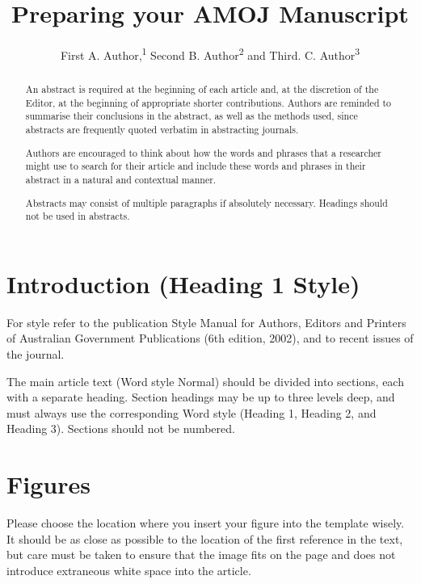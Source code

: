 \documentclass[10pt]{article}
\title{Preparing your AMOJ Manuscript}
\author{First A. Author,\textsuperscript{1} Second B. Author\textsuperscript{2} and Third. C. Author\textsuperscript{3}}
\begin{document}
\maketitle


\begin{abstract}
An abstract is required at the beginning of each article and, at the discretion of the Editor, at the beginning of appropriate shorter contributions. Authors are reminded to summarise their conclusions in the abstract, as well as the methods used, since abstracts are frequently quoted verbatim in abstracting journals.

Authors are encouraged to think about how the words and phrases that a researcher might use to search for their article and include these words and phrases in their abstract in a natural and contextual manner.

Abstracts may consist of multiple paragraphs if absolutely necessary. Headings should not be used in abstracts.
\end{abstract}


\section{Introduction (Heading 1 Style)}
For style refer to the publication Style Manual for Authors, Editors and Printers of Australian Government Publications (6th edition, 2002), and to recent issues of the journal.

The main article text (Word style Normal) should be divided into sections, each with a separate heading. Section headings may be up to three levels deep, and must always use the corresponding Word style (Heading 1, Heading 2, and Heading 3). Sections should not be numbered.

\section{Figures}
\label{figures}
Please choose the location where you insert your figure into the template wisely. It should be as close as possible to the location of the first reference in the text, but care must be taken to ensure that the image fits on the page and does not introduce extraneous white space into the article.
\end{document}
